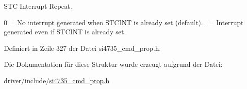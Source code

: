 S\+T\+C Interrupt Repeat. 

0 = No interrupt generated when S\+T\+C\+I\+N\+T is already set (default).~ = Interrupt generated even if S\+T\+C\+I\+N\+T is already set. 

Definiert in Zeile 327 der Datei si4735\+\_\+cmd\+\_\+prop.\+h.



Die Dokumentation für diese Struktur wurde erzeugt aufgrund der Datei\+:\begin{DoxyCompactItemize}
\item 
driver/include/\hyperlink{si4735__cmd__prop_8h}{si4735\+\_\+cmd\+\_\+prop.\+h}\end{DoxyCompactItemize}
